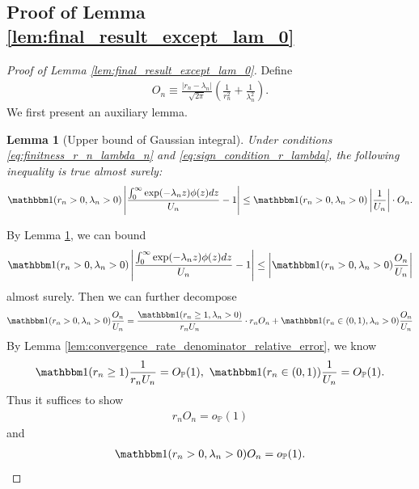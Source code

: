 \documentclass[12pt]{article}
\newtheorem{lemma}{Lemma}
\theoremstyle{definition}
\def\P{\mathbb{P}}
\def\P{\mathbb{P}}
\renewcommand{\P}{\mathbb{P}}							%
\newcommand{\indicator}{\mathbbm 1}						%
\begin{document}
  \subsection{Proof of Lemma \ref{lem:final_result_except_lam_0}}


	\begin{proof}[Proof of Lemma \ref{lem:final_result_except_lam_0}]
		Define 
		\begin{align*}
			O_n\equiv \frac{|r_n-\lambda_n|}{\sqrt{2\pi}}\left(\frac{1}{r_n^2}+\frac{1}{\lambda_n^2}\right).
		\end{align*}
		We first present an auxiliary lemma.
		\begin{lemma}[Upper bound of Gaussian integral]\label{lem:upper_bound_Gaussian_integral}
			Under conditions \eqref{eq:finitness_r_n_lambda_n} and \eqref{eq:sign_condition_r_lambda}, the following inequality is true almost surely:
			 \begin{align*}
				\indicator(r_n> 0,\lambda_n> 0)\left|\frac{\int_0^\infty \exp(-\lambda_n z)\phi(z)dz}{U_n}-1\right|\leq \indicator(r_n > 0,\lambda_n > 0)\left|\frac{1}{U_n}\right|\cdot O_n.
			\end{align*}
		\end{lemma}
		\noindent By Lemma \ref{lem:upper_bound_Gaussian_integral}, we can bound 
		\begin{align*}
			\indicator(r_n> 0,\lambda_n> 0)\left|\frac{\int_0^\infty \exp(-\lambda_n z)\phi(z)dz}{U_n}-1\right|\leq\left| \indicator(r_n> 0,\lambda_n> 0)\frac{O_n}{U_n} \right|
		\end{align*}
		almost surely. Then we can further decompose 
		\begin{align*}
			\indicator(r_n> 0,\lambda_n> 0)\frac{O_n}{U_n}=\frac{\indicator(r_n\geq 1,\lambda_n> 0)}{r_nU_n}\cdot r_n O_n+ \indicator(r_n\in (0,1),\lambda_n> 0)\frac{O_n}{U_n}
		\end{align*}
		By Lemma \ref{lem:convergence_rate_denominator_relative_error}, we know 
	\begin{align*}
		\indicator(r_n\geq 1)\frac{1}{r_nU_n}=O_{\P}(1),\ \indicator(r_n\in (0,1))\frac{1}{U_n}=O_{\P}(1).
	\end{align*}
	Thus it suffices to show 
	\begin{align}\label{eq:remainder_bound_1}
		r_n O_n =o_{\P}(1)
	\end{align}
	and 
	\begin{align}\label{eq:remainder_bound_2}
		\indicator(r_n>0,\lambda_n>0)O_n=o_{\P}(1).
	\end{align}
	

\end{proof}
\end{document}
